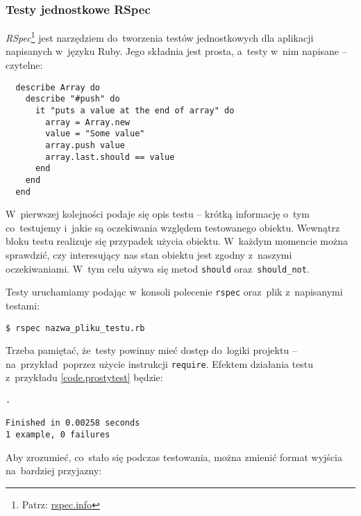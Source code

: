 \subsubsection{Testy jednostkowe RSpec} \label{dokumentacja.rspec}

\textit{RSpec}\footnote{Patrz: \url{rspec.info}} jest narzędziem do~tworzenia testów jednostkowych dla aplikacji napisanych w~języku Ruby. Jego składnia jest prosta, a~testy w~nim napisane -- czytelne:

   \label{code.prostytest}
  \begin{lstlisting}
  describe Array do
    describe "#push" do
      it "puts a value at the end of array" do
        array = Array.new
        value = "Some value"
        array.push value
        array.last.should == value
      end
    end
  end
  \end{lstlisting}

W~pierwszej kolejności podaje się opis testu -- krótką informację o~tym co~testujemy i~jakie są oczekiwania względem testowanego obiektu. Wewnątrz bloku testu realizuje się przypadek użycia obiektu. W~każdym momencie można sprawdzić, czy interesujący nas stan obiektu jest zgodny z~naszymi oczekiwaniami. W~tym celu używa się metod \texttt{should} oraz~\texttt{should\_not}.


Testy uruchamiamy podając w~konsoli polecenie \texttt{rspec} oraz~plik z~napisanymi testami:

\mbox{\texttt{\$ rspec nazwa\_pliku\_testu.rb}}

Trzeba pamiętać, że~testy powinny mieć dostęp do~logiki projektu -- na~przykład~poprzez użycie instrukcji \texttt{require}. Efektem działania testu z~przykładu \ref{code.prostytest} będzie:

  \begin{lstlisting}
.

Finished in 0.00258 seconds
1 example, 0 failures
  \end{lstlisting}

Aby zrozumieć, co~stało się podczas testowania, można zmienić format wyjścia na~bardziej przyjazny:

